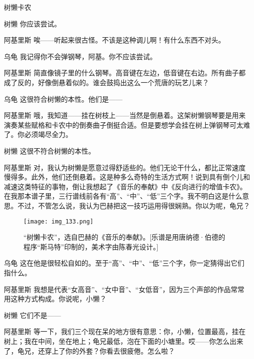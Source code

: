 \begin{dialog}{树懒卡农}
\begin{dialogue}
\item[树懒]你应该尝试。


\item[阿基里斯]唉——听起来很古怪。不该是这种调儿啊！有什么东西不对头。

\item[乌龟]我记得你不会弹钢琴，阿基。你不应该尝试。

\item[阿基里斯]简直像镜子里的什么钢琴。高音键在左边，低音键在右边。所有曲子都成了反的，好像倒悬着似的。谁会鼓捣出这么一个荒唐的玩艺儿来？

\item[乌龟]这很符合树懒的本性。他们是——

\item[阿基里斯]哦，我知道——挂在树枝上——当然是倒悬着。这架树懒钢琴要是用来演奏某些赋格和卡农中的倒奏曲子倒挺合适。但是要想学会挂在树上弹钢琴可太难了。你必须竭尽全力。

\item[树懒]这很不符合树懒的本性。

\item[阿基里斯]对，我认为树懒是愿意过得舒适些的。他们无论干什么，都比正常速度慢得多。此外，他们还倒悬着。这是种多么奇特的生活方式啊！说到具有倒个儿和减速这类特征的事物，倒让我想起了《音乐的奉献》中《反向进行的增值卡农》。在我那本谱子里，三行谱线前各有“高”、“中”、“低”三个字。我不明白这是什么意思。不过，不管怎么说，我认为巴赫把这一技巧运用得很娴熟。你以为呢，龟兄？

\begin{figure}
\texttt{[image: img\_133.png]}
\caption[《树懒卡农》，选自巴赫《音乐的奉献》。]
  {“树懒卡农”，选自巴赫的《音乐的奉献》。[乐谱是用唐纳德·伯德的程序“斯马特”印制的，美术字由陈春光设计。]}
\end{figure}

\item[乌龟]这在他是很轻松自如的。至于“高”、“中”、“低”三个字，你一定猜得出它们指什么。

\item[阿基里斯]我想是代表“女高音”、“女中音”、“女低音”，因为三个声部的作品常常用这种方式构成。你说呢，小懒？

\item[树懒]它们不是——

\item[阿基里斯]等一下，我们三个现在呆的地方很有意思：你，小懒，位置最高，挂在树上；我在中间，坐在地上；龟兄最低，泡在下面的小塘里。哎——你怎么出来了，龟兄，还穿上了你的外套？你看去很疲倦。怎么啦？


\end{dialogue}
\end{dialog}
